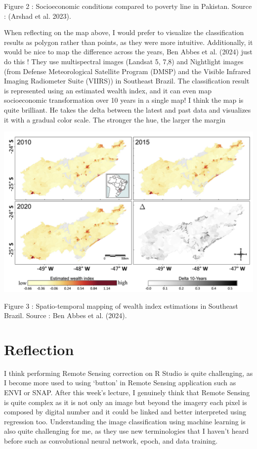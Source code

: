\documentclass[
  letterpaper,
  DIV=11,
  numbers=noendperiod]{scrreprt}
\begin{document}
Figure 2 : Socioeconomic conditions compared to poverty line in
Pakistan. Source : (Arshad et al. 2023).

When reflecting on the map above, I would prefer to visualize the
classification results as polygon rather than points, as they were more
intuitive. Additionally, it would be nice to map the difference across
the years, Ben Abbes et al. (2024) just do this ! They use multispectral
images (Landsat 5, 7,8) and Nightlight images (from Defense
Meteorological Satellite Program (DMSP) and the Visible Infrared Imaging
Radiometer Suite (VIIRS)) in Southeast Brazil. The classification result
is represented using an estimated wealth index, and it can even map
socioeconomic transformation over 10 years in a single map! I think the
map is quite brilliant. He takes the delta between the latest and past
data and visualizes it with a gradual color scale. The stronger the hue,
the larger the margin

\includegraphics[width=6.03125in,height=\textheight]{images/clipboard-422155352.png}

Figure 3 : Spatio-temporal mapping of wealth index estimations in
Southeast Brazil. Source : Ben Abbes et al. (2024).

\hypertarget{reflection-1}{%
\section{Reflection}\label{reflection-1}}

I think performing Remote Sensing correction on R Studio is quite
challenging, as I become more used to using `button' in Remote Sensing
application such as ENVI or SNAP. After this week's lecture, I genuinely
think that Remote Sensing is quite complex as it is not only an image
but beyond the imagery each pixel is composed by digital number and it
could be linked and better interpreted using regression too.
Understanding the image classification using machine learning is also
quite challenging for me, as they use new terminologies that I haven't
heard before such as convolutional neural network, epoch, and data
training.
\end{document}
